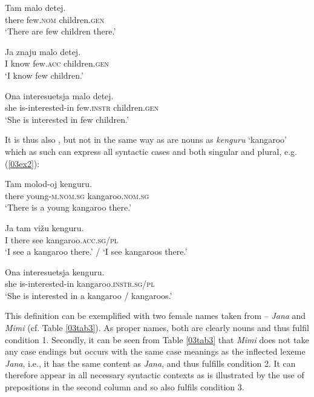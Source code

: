 \documentclass[output=paper,colorlinks,citecolor=brown]{langscibook}
\begin{document}
\begin{exe}
	\ex \label{03ex1}
	\begin{xlist}
		\ex \gll Tam malo detej. \\
		there few.\textsc{nom} children.\textsc{gen} \\
		\trans ‘There are few children there.’
		
		\ex \gll Ja znaju malo detej. \\
		I know few.\textsc{acc} children.\textsc{gen} \\
		\trans ‘I know few children.’

		\ex \gll *Ona interesuetsja malo detej. \\
		\phantom{*}she is-interested-in few.\textsc{instr} children.\textsc{gen} \\
		\trans ‘She is interested in few children.’
	\end{xlist}
\end{exe}

It is thus also , but not in the same way as are nouns as \emph{kenguru} `kangaroo' which as such can express all syntactic cases and both singular and plural, e.g. (\ref{03ex2}):

\begin{exe}
	\ex \label{03ex2}
	\begin{xlist}
		\ex \gll Tam molod-oj kenguru. \\
		there young-\textsc{m.nom.sg} kangaroo.\textsc{nom.sg} \\
		\trans ‘There is a young kangaroo there.’
		
		\ex \gll Ja tam vižu kenguru. \\
		I there see kangaroo.\textsc{acc.sg/pl} \\
		\trans ‘I see a kangaroo there.’ / ‘I see kangaroos there.’
		
		\ex \gll Ona interesuetsja kenguru. \\
		she is-interested-in kangaroo.\textsc{instr.sg/pl} \\
		\trans ‘She is interested in a kangaroo / kangaroos.’
	\end{xlist}
\end{exe}

This definition can be exemplified with two female names taken from  -- \emph{Jana} and \emph{Mimi} (cf. Table \ref{03tab3}). As proper names, both are clearly nouns and thus fulfil condition 1. Secondly, it can be seen from Table \ref{03tab3} that \emph{Mimi} does not take any case endings but occurs with the same case meanings as the inflected lexeme \emph{Jana}, i.e., it has the same content  as \emph{Jana}, and thus fulfills condition 2. It can therefore appear in all necessary syntactic contexts as is illustrated by the use of prepositions in the second column and so also fulfils condition 3.
\end{document}

